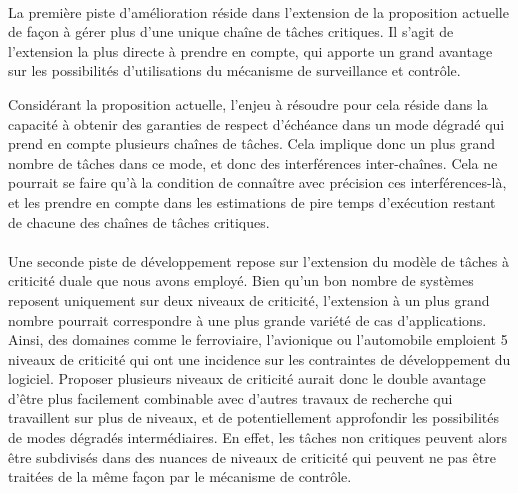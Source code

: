 \documentclass[a4paper,11pt,twoside]{StyleThese}
\begin{document}
\paragraph*{} La première piste d'amélioration réside dans l'extension de la proposition actuelle de façon à gérer plus d'une unique chaîne de tâches critiques. Il s'agit de l'extension la plus directe à prendre en compte, qui apporte un grand avantage sur les possibilités d'utilisations du mécanisme de surveillance et contrôle. 

Considérant la proposition actuelle, l'enjeu à résoudre pour cela réside dans la capacité à obtenir des garanties de respect d'échéance dans un mode dégradé qui prend en compte plusieurs chaînes de tâches. Cela implique donc un plus grand nombre de tâches dans ce mode, et donc des interférences inter-chaînes. Cela ne pourrait se faire qu'à la condition de connaître avec précision ces interférences-là, et les prendre en compte dans les estimations de pire temps d'exécution restant de chacune des chaînes de tâches critiques.

\paragraph*{} Une seconde piste de développement repose sur l'extension du modèle de tâches à criticité duale que nous avons employé. Bien qu'un bon nombre de systèmes reposent uniquement sur deux niveaux de criticité, l’extension à un plus grand nombre pourrait correspondre à une plus grande variété de cas d'applications. Ainsi, des domaines comme le ferroviaire, l'avionique ou l'automobile emploient 5 niveaux de criticité qui ont une incidence sur les contraintes de développement du logiciel. Proposer plusieurs niveaux de criticité aurait donc le double avantage d'être plus facilement combinable avec d'autres travaux de recherche qui travaillent sur plus de niveaux, et de potentiellement approfondir les possibilités de modes dégradés intermédiaires. En effet, les tâches non critiques peuvent alors être subdivisés dans des nuances de niveaux de criticité qui peuvent ne pas être traitées de la même façon par le mécanisme de contrôle.
\end{document}
